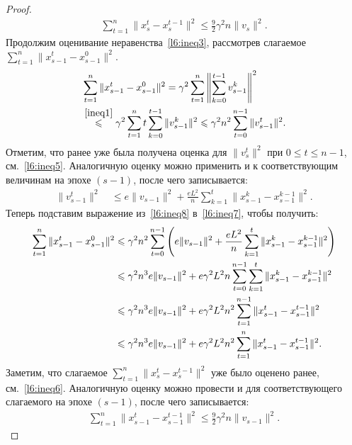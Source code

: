 \begin{lemma}
\begin{proof}
\begin{align}
\label{l6:ineq6}
    \sum\limits_{t=1}^n\|x_s^t - x_s^{t-1}\|^2 \leqslant \frac{9}{2}\gamma^2 n\|v_s\|^2.
\end{align}
Продолжим оценивание неравенства~\eqref{l6:ineq3}, рассмотрев слагаемое \(\sum\limits_{t=1}^n \|x_{s-1}^t - x_{s-1}^0\|^2\).
\begin{align}
    \notag & \sum\limits_{t=1}^n \|x_{s-1}^t - x_{s-1}^0\|^2 = \gamma^2\sum\limits_{t=1}^n \left\|\sum\limits_{k = 0}^{t-1} v_{s-1}^k\right\|^2 
    \\ &\overset{\eqref{ineq1}}{\leqslant} \gamma^2\sum\limits_{t=1}^n t \sum\limits_{k = 0}^{t-1} \|v_{s-1}^k\|^2 \leqslant \gamma^2 n^2 \sum\limits_{t = 0}^{n-1}  \|v_{s-1}^t\|^2.    \label{l6:ineq7}
\end{align}
Отметим, что ранее уже была получена оценка для \(\|v_s^t\|^2\) при \(0 \leqslant t \leqslant n - 1\), см.~\eqref{l6:ineq5}. Аналогичную оценку можно применить и к соответствующим величинам на эпохе \((s-1)\), после чего записывается:
\begin{align}
\label{l6:ineq8}
    \|v_{s-1}^t\|^2 & ~\leqslant e \|v_{s-1}\|^2 + \frac{e L^2}{n}\sum\limits_{k = 1}^t\|x_{s-1}^k - x_{s-1}^{k-1}\|^2.
\end{align}
Теперь подставим выражение из~\eqref{l6:ineq8} в~\eqref{l6:ineq7}, чтобы получить:
\begin{align}
    \notag\sum\limits_{t=1}^n \|x_{s-1}^t - x_{s-1}^0\|^2 &\leqslant \gamma^2 n^2\sum\limits_{t=0}^{n-1} \left(e\|v_{s-1}\|^2 + \frac{e L^2}{n}\sum\limits_{k = 1}^t\|x_{s-1}^k - x_{s-1}^{k-1}\|^2\right)\\
    \notag& \leqslant \gamma^2 n^3 e \|v_{s-1}\|^2 + e\gamma^2 L^2n\sum\limits_{t = 0}^{n-1}\sum\limits_{k = 1}^t\|x_{s-1}^k - x_{s-1}^{k-1}\|^2\\
    \notag& \leqslant \gamma^2 n^3 e\|v_{s-1}\|^2 + e\gamma^2L^2 n^2 \sum\limits_{t = 1}^{n-1}\|x_{s-1}^t - x_{s-1}^{t-1}\|^2\\
    \label{l6:ineq9}
    & \leqslant \gamma^2 n^3 e\|v_{s-1}\|^2 + e\gamma^2L^2 n^2 \sum\limits_{t = 1}^{n}\|x_{s-1}^t - x_{s-1}^{t-1}\|^2.
\end{align}
Заметим, что слагаемое \(\sum\limits_{t = 1}^{n}\|x_{s}^t - x_{s}^{t-1}\|^2\) уже было оценено ранее, см.~\eqref{l6:ineq6}. Аналогичную оценку можно провести и для соответствующего слагаемого на эпохе \((s - 1)\), после чего записывается:
\begin{align}
\label{l6:ineq10}
    \sum\limits_{t=1}^n\|x_{s-1}^t - x_{s-1}^{t-1}\|^2 \leqslant \frac{9}{2}\gamma^2 n\|v_{s-1}\|^2.

\end{align}
\end{proof}
\end{lemma}
